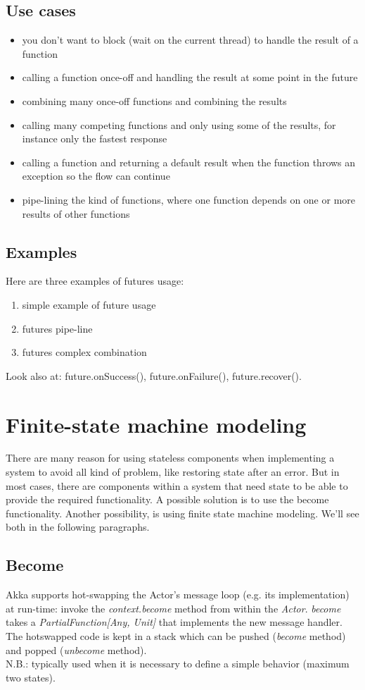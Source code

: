 \documentclass{article}
\begin{document}
\subsection{Use cases}
\begin{itemize}
\item you don't want to block (wait on the current thread) to handle the result of a function
\item calling a function once-off and handling the result at some point in the future
\item combining many once-off functions and combining the results
\item calling many competing functions and only using some of the results, for instance only the fastest response
\item calling a function and returning a default result when the function throws an exception so the flow can continue
\item pipe-lining the kind of functions, where one function depends on one or more results of other functions
\end{itemize}

\subsection{Examples}
Here are three examples of futures usage:
\begin{enumerate}
\item simple example of future usage
\item futures pipe-line
\item futures complex combination
\end{enumerate}

\vskip 0.3cm
Look also at: future.onSuccess(), future.onFailure(), future.recover().

\section{Finite-state machine modeling}
There are many reason for using stateless components when implementing a system to avoid all kind of problem, like restoring state after an error. But in most cases, there are components within a system that need state to be able to provide the required functionality. A possible solution is to use the become functionality. Another possibility, is using finite state machine modeling. We'll see both in the following paragraphs.

\subsection{Become}
Akka supports hot-swapping the Actor’s message loop (e.g. its implementation) at run-time: invoke the \textit{context.become} method from within the \textit{Actor}. \textit{become} takes a \textit{PartialFunction[Any, Unit]} that implements the new message handler. The hotswapped code is kept in a stack which can be pushed (\textit{become} method) and popped (\textit{unbecome} method). \\
N.B.: typically used when it is necessary to define a  simple behavior (maximum two states).
\end{document}
